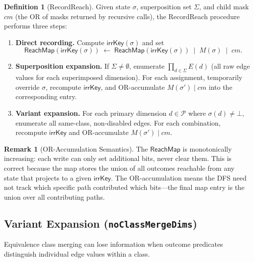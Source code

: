 \documentclass[11pt]{article}
\theoremstyle{definition}
\newtheorem{definition}[theorem]{Definition}
\newtheorem{remark}[theorem]{Remark}
\newcommand{\Edg}[1]{E(#1)}            %
\newcommand{\sel}{\sigma}              %
\newcommand{\ik}{\mathsf{irrKey}}      %
\begin{document}
\begin{definition}[RecordReach]\label{def:recordreach}
Given state $\sel$, superposition set $\Sigma$, and child mask
$\mathit{cm}$ (the OR of masks returned by recursive calls), the
\textsf{RecordReach} procedure performs three steps:
\begin{enumerate}[label=(\roman*)]
  \item \textbf{Direct recording.}
    Compute $\ik(\sel)$ and set
    \[
      \mathsf{ReachMap}(\ik(\sel)) \;\gets\;
      \mathsf{ReachMap}(\ik(\sel)) \;\mathbin{|}\;
      M(\sel) \;\mathbin{|}\; \mathit{cm}.
    \]
  \item \textbf{Superposition expansion.}
    If $\Sigma \neq \emptyset$, enumerate
    $\prod_{d \in \Sigma} \Edg{d}$ (all raw edge values for each
    superimposed dimension). For each assignment, temporarily override
    $\sel$, recompute $\ik$, and OR-accumulate
    $M(\sel') \mathbin{|} \mathit{cm}$ into the corresponding entry.
  \item \textbf{Variant expansion.}
    For each primary dimension $d \in \mathcal{P}$ where
    $\sel(d) \neq \bot$, enumerate all same-class, non-disabled edges.
    For each combination, recompute $\ik$ and OR-accumulate
    $M(\sel') \mathbin{|} \mathit{cm}$.
\end{enumerate}
\end{definition}

\begin{remark}[OR-Accumulation Semantics]
The $\mathsf{ReachMap}$ is monotonically increasing: each write can only
set additional bits, never clear them. This is correct because the map
stores the union of all outcomes reachable from any state that projects to
a given $\ik$. The OR-accumulation means the DFS need not track which
specific path contributed which bits---the final map entry is the union
over all contributing paths.
\end{remark}

\subsection{Variant Expansion (\texttt{noClassMergeDims})}
\label{sec:variants}

Equivalence class merging can lose information when outcome predicates
distinguish individual edge values within a class.
\end{document}
